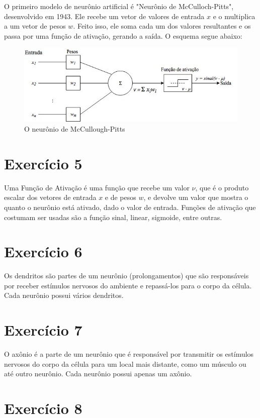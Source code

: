 \documentclass[a4]{article}
\begin{document}
O primeiro modelo de neurônio artificial é "Neurônio de McCulloch-Pitts", desenvolvido em 1943. Ele recebe um vetor de valores de entrada $ x $ e o multiplica a um vetor de pesos $ w $. Feito isso, ele soma cada um dos valores resultantes e os passa por uma função de ativação, gerando a saída. O esquema segue abaixo:

\begin{figure}[H]
	\centering
	\includegraphics[width=0.8\linewidth]{neuronio.jpg}
	\caption{O neurônio de McCullough-Pitts}
\end{figure}

\section*{Exercício 5}

Uma Função de Ativação é uma função que recebe um valor $ \nu $, que é o produto escalar dos vetores de entrada $ x $ e de pesos $ w $, e devolve um valor que mostra o quanto o neurônio está ativado, dado o valor de entrada. Funções de ativação que costumam ser usadas são a função sinal, linear, sigmoide, entre outras.
 
\section*{Exercício 6}

Os dendritos são partes de um neurônio (prolongamentos) que são responsáveis por receber estímulos nervosos do ambiente e repassá-los para o corpo da célula. Cada neurônio possui vários dendritos. 

\section*{Exercício 7}

O axônio é a parte de um neurônio que é responsável por transmitir os estímulos nervosos do corpo da célula para um local mais distante, como um músculo ou até outro neurônio. Cada neurônio possui apenas um axônio.

\section*{Exercício 8}
\end{document}

